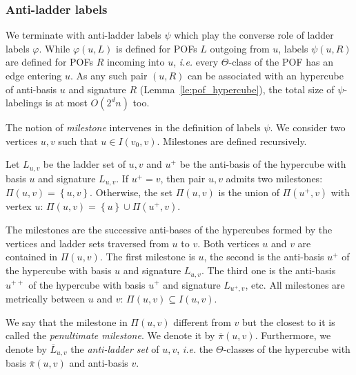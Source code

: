 \documentclass[a4paper,UKenglish,numberwithinsect,cleveref, autoref]{lipics-v2021}
\newcommand{\set}[1]{\left\{ #1 \right\}}
\begin{document}
\subsubsection{Anti-ladder labels} \label{subsubsec:anti_ladder}

We terminate with anti-ladder labels $\psi$ which play the converse role of ladder labels $\varphi$. While $\varphi(u,L)$ is defined for POFs $L$ outgoing from $u$, labels $\psi(u,R)$ are defined for POFs $R$ incoming into $u$, {\em i.e.} every $\Theta$-class of the POF has an edge entering $u$. As any such pair $(u,R)$ can be associated with an hypercube of anti-basis $u$ and signature $R$ (Lemma~\ref{le:pof_hypercube}), the total size of $\psi$-labelings is at most $O(2^dn)$ too.

The notion of \textit{milestone} intervenes in the definition of labels $\psi$. We consider two vertices $u,v$ such that $u \in I(v_0,v)$. Milestones are defined recursively.

\begin{definition}[Milestones $\Pi(u,v)$]
Let $L_{u,v}$ be the ladder set of $u,v$ and $u^+$ be the anti-basis of the hypercube with basis $u$ and signature $L_{u,v}$.
If $u^+ = v$, then pair $u,v$ admits two milestones: $\Pi(u,v) = \set{u,v}$. Otherwise, the set $\Pi(u,v)$ is the union of $\Pi(u^+,v)$ with vertex $u$: $\Pi(u,v) = \set{u} \cup \Pi(u^+,v)$.
\label{def:milestones}
\end{definition}

The milestones are the successive anti-bases of the hypercubes formed by the vertices and ladder sets traversed from $u$ to $v$. Both vertices $u$ and $v$ are contained in $\Pi(u,v)$. The first milestone is $u$, the second is the anti-basis $u^+$ of the hypercube with basis $u$ and signature $L_{u,v}$. The third one is the anti-basis $u^{++}$ of the hypercube with basis $u^+$ and signature $L_{u^+,v}$, etc. All milestones are metrically between $u$ and $v$: $\Pi(u,v) \subseteq I(u,v)$. 

\begin{definition}
We say that the milestone in $\Pi(u,v)$ different from $v$ but the closest to it is called the \textit{penultimate milestone}. We denote it by $\overline{\pi}(u,v)$. Furthermore, we denote by $\overline{L}_{u,v}$ the \emph{anti-ladder set} of $u,v$, {\em i.e.} the $\Theta$-classes of the hypercube with basis $\overline{\pi}(u,v)$ and anti-basis $v$. 
\end{definition}
\end{document}
